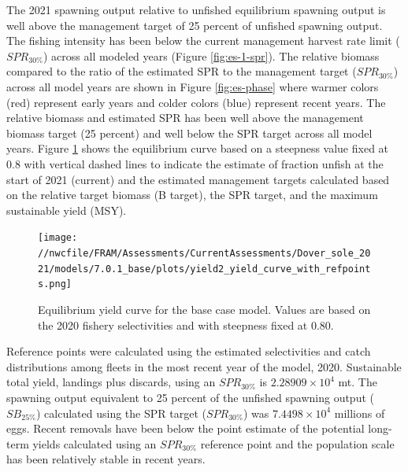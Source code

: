 \documentclass[11pt,
  english,
  a4paper,
]{article}
\begin{document}
The 2021 spawning output relative to unfished equilibrium spawning output is well above the management target of 25 percent of unfished spawning output. The fishing intensity has been below the current management harvest rate limit ({\(SPR_{30\%}\)\leavevmode\tagmcend\tagstructend}) across all modeled years (Figure \ref{fig:es-1-spr}). The relative biomass compared to the ratio of the estimated SPR to the management target ({\(SPR_{30\%}\)\leavevmode\tagmcend\tagstructend}) across all model years are shown in Figure \ref{fig:es-phase} where warmer colors (red) represent early years and colder colors (blue) represent recent years. The relative biomass and estimated SPR has been well above the management biomass target (25 percent) and well below the SPR target across all model years. Figure \ref{fig:es-yield} shows the equilibrium curve based on a steepness value fixed at 0.8 with vertical dashed lines to indicate the estimate of fraction unfish at the start of 2021 (current) and the estimated management targets calculated based on the relative target biomass (B target), the SPR target, and the maximum sustainable yield (MSY).

\leavevmode\tagmcend\tagstructend\par


\begin{figure}
\centering
\texttt{[image: //nwcfile/FRAM/Assessments/CurrentAssessments/Dover\_sole\_2021/models/7.0.1\_base/plots/yield2\_yield\_curve\_with\_refpoints.png]}
\caption{Equilibrium yield curve for the base case model. Values are based on the 2020 fishery selectivities and with steepness fixed at 0.80.\label{fig:es-yield}}
\end{figure}

\tagmcend\tagstructend


Reference points were calculated using the estimated selectivities and catch distributions among fleets in the most recent year of the model, 2020. Sustainable total yield, landings plus discards, using an {\(SPR_{30\%}\)\leavevmode\tagmcend\tagstructend} is \ensuremath{2.28909\times 10^{4}} mt. The spawning output equivalent to 25 percent of the unfished spawning output ({\(SB_{25\%}\)\leavevmode\tagmcend\tagstructend}) calculated using the SPR target ({\(SPR_{30\%}\)\leavevmode\tagmcend\tagstructend}) was \ensuremath{7.4498\times 10^{4}} millions of eggs. Recent removals have been below the point estimate of the potential long-term yields calculated using an {\(SPR_{30\%}\)\leavevmode\tagmcend\tagstructend} reference point and the population scale has been relatively stable in recent years.
\end{document}
